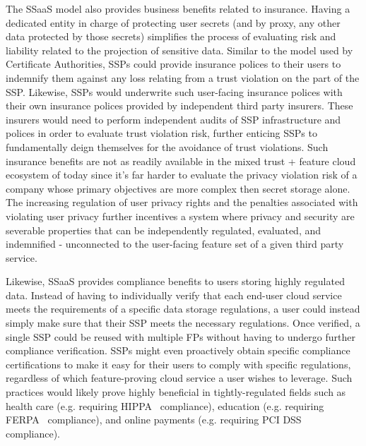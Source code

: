 The SSaaS model also provides business benefits related to
insurance. Having a dedicated entity in charge of protecting user
secrets (and by proxy, any other data protected by those secrets)
simplifies the process of evaluating risk and liability related to the
projection of sensitive data. Similar to the model used by Certificate
Authorities, SSPs could provide insurance polices to their users to
indemnify them against any loss relating from a trust violation on the
part of the SSP. Likewise, SSPs would underwrite such user-facing
insurance polices with their own insurance polices provided by
independent third party insurers. These insurers would need to perform
independent audits of SSP infrastructure and polices in order to
evaluate trust violation risk, further enticing SSPs to fundamentally
deign themselves for the avoidance of trust violations. Such insurance
benefits are not as readily available in the mixed trust + feature
cloud ecosystem of today since it's far harder to evaluate the privacy
violation risk of a company whose primary objectives are more complex
then secret storage alone. The increasing regulation of user privacy
rights and the penalties associated with violating user privacy
further incentives a system where privacy and security are severable
properties that can be independently regulated, evaluated, and
indemnified - unconnected to the user-facing feature set of a given
third party service.

Likewise, SSaaS provides compliance benefits to users storing highly
regulated data. Instead of having to individually verify that each
end-user cloud service meets the requirements of a specific data
storage regulations, a user could instead simply make sure that their
SSP meets the necessary regulations. Once verified, a single SSP could
be reused with multiple FPs without having to undergo further
compliance verification. SSPs might even proactively obtain specific
compliance certifications to make it easy for their users to comply
with specific regulations, regardless of which feature-proving cloud
service a user wishes to leverage. Such practices would likely prove
highly beneficial in tightly-regulated fields such as health care
(e.g. requiring HIPPA~\cite{hippa} compliance), education
(e.g. requiring FERPA~\cite{ferpa} compliance), and online payments
(e.g. requiring PCI DSS~\cite{pcidss} compliance).

